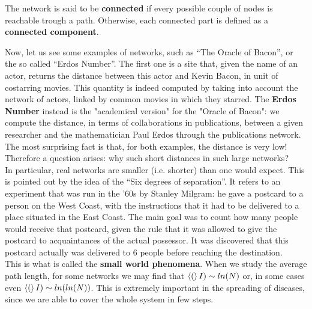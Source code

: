 \documentclass[../main/main.tex]{subfiles}
\begin{document}
The network is said to be \textbf{connected} if every possible couple of nodes is reachable trough a path. Otherwise, each connected part is defined as a \textbf{connected component}.

\medskip

Now, let us see some examples of networks, such as “The Oracle of Bacon”, or the so called “Erdos Number”. The first one is a site that, given the name of an actor, returns the distance between this actor and Kevin Bacon,  in unit of costarring movies. This quantity is indeed computed by taking into account the network of actors, linked by common movies in which they starred. The \textbf{Erdos Number} instead is the "academical version" for the "Oracle of Bacon": we compute the distance, in terms of collaborations in publications, between a given researcher and the mathematician Paul Erdos through the publications network. The most surprising fact is that, for both examples, the distance is very low! Therefore a question arises: why such short distances in such large networks?\\
In particular, real networks are smaller (i.e. shorter) than one would expect. This is pointed out by the idea of the “Six degrees of separation”. It refers to an experiment that was run in the '60s by Stanley Milgram: he gave a postcard to a person on the West Coast, with the instructions that it had to be delivered to a place situated in the East Coast. The main goal was to count how many people would receive that postcard, given the rule that it was allowed to give the postcard to acquaintances of the actual possessor. It was discovered that this postcard actually was delivered to 6 people before reaching the destination.\\
This is what is called the \textbf{small world phenomena}. When we study the average path length, for some networks we may find that $\expval(I) \sim ln(N)$ or, in some cases even $\expval(I) \sim ln(ln(N))$. This is extremely important in the spreading of diseases, since we are able to cover the whole system in few steps.
\end{document}
